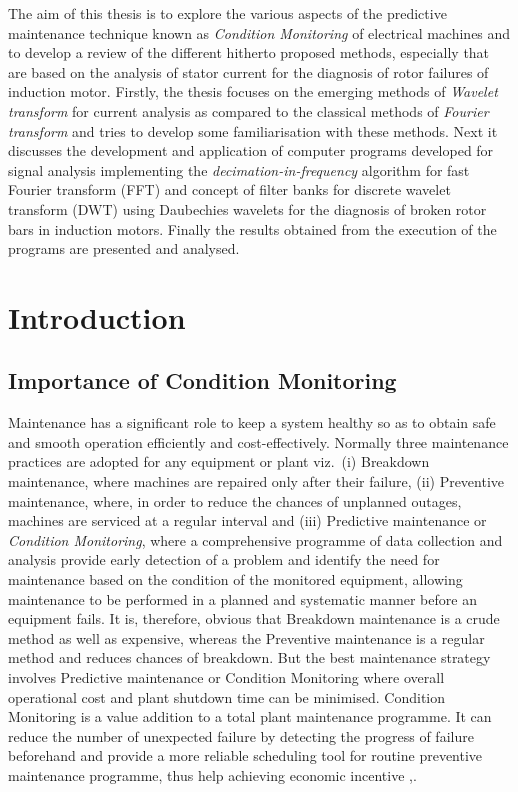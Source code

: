 \documentclass[a4paper,11pt]{report}
\begin{document}
\abstract
The aim of this thesis is to explore the various aspects of the predictive maintenance technique known as \emph{Condition Monitoring} of electrical machines and to develop a review of the different hitherto proposed methods, especially that are based on the analysis of stator current for the diagnosis of rotor failures of induction motor. Firstly, the thesis focuses on the emerging methods of \emph{Wavelet transform} for current analysis as compared to the classical methods of \emph{Fourier transform} and tries to develop some familiarisation with these methods. Next it discusses the development and application of computer programs developed for signal analysis implementing the \emph{decimation-in-frequency} algorithm for fast Fourier transform (FFT) and concept of filter banks for discrete wavelet transform (DWT) using Daubechies wavelets for the diagnosis of broken rotor bars in induction motors. Finally the results obtained from the execution of the programs are presented and analysed.




\chapter{Introduction}

\section{Importance of Condition Monitoring}
Maintenance has a significant role to keep a system healthy so as to obtain safe and smooth operation efficiently and cost-effectively. Normally three maintenance practices are adopted for any equipment or plant viz.~(i) Breakdown maintenance, where machines are repaired only after their failure, (ii) Preventive maintenance, where, in order to reduce the chances of unplanned outages, machines are serviced at a regular interval and (iii) Predictive maintenance or \emph{Condition Monitoring}, where a comprehensive programme of data collection and analysis provide early detection of a problem and identify the need for maintenance based on the condition of the monitored equipment, allowing maintenance to be performed in a planned and systematic manner before an equipment fails. It is, therefore, obvious that Breakdown maintenance is a crude method as well as expensive, whereas the Preventive maintenance is a regular method and reduces chances of breakdown. But the best maintenance strategy involves Predictive maintenance or Condition Monitoring where overall operational cost and plant shutdown time can be minimised. Condition Monitoring is a value addition to a total plant maintenance programme. It can reduce the number of unexpected failure by detecting the progress of failure beforehand and provide a more reliable scheduling tool for routine preventive maintenance programme, thus help achieving economic incentive \cite{Penman},\cite{rps1}. 
\end{document}
